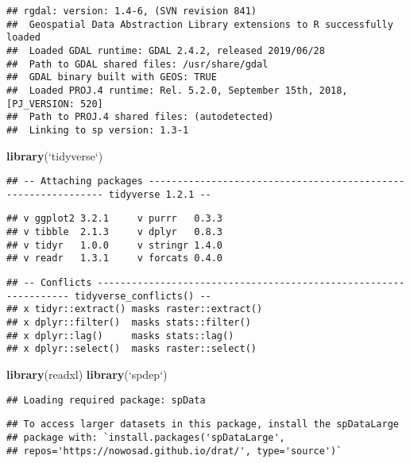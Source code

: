 \documentclass[11pt,]{article}
\newenvironment{Shaded}{\begin{snugshade}}{\end{snugshade}}
\newcommand{\KeywordTok}[1]{\textcolor[rgb]{0.13,0.29,0.53}{\textbf{#1}}}
\newcommand{\DataTypeTok}[1]{\textcolor[rgb]{0.13,0.29,0.53}{#1}}
\newcommand{\StringTok}[1]{\textcolor[rgb]{0.31,0.60,0.02}{#1}}
\newcommand{\NormalTok}[1]{#1}
\begin{document}
\begin{verbatim}
## rgdal: version: 1.4-6, (SVN revision 841)
##  Geospatial Data Abstraction Library extensions to R successfully loaded
##  Loaded GDAL runtime: GDAL 2.4.2, released 2019/06/28
##  Path to GDAL shared files: /usr/share/gdal
##  GDAL binary built with GEOS: TRUE 
##  Loaded PROJ.4 runtime: Rel. 5.2.0, September 15th, 2018, [PJ_VERSION: 520]
##  Path to PROJ.4 shared files: (autodetected)
##  Linking to sp version: 1.3-1
\end{verbatim}

\begin{Shaded}
\begin{Highlighting}[]
\KeywordTok{library}\NormalTok{(}\StringTok{`}\DataTypeTok{tidyverse}\StringTok{`}\NormalTok{)}
\end{Highlighting}
\end{Shaded}

\begin{verbatim}
## -- Attaching packages -------------------------------------------------------------- tidyverse 1.2.1 --
\end{verbatim}

\begin{verbatim}
## v ggplot2 3.2.1     v purrr   0.3.3
## v tibble  2.1.3     v dplyr   0.8.3
## v tidyr   1.0.0     v stringr 1.4.0
## v readr   1.3.1     v forcats 0.4.0
\end{verbatim}

\begin{verbatim}
## -- Conflicts ----------------------------------------------------------------- tidyverse_conflicts() --
## x tidyr::extract() masks raster::extract()
## x dplyr::filter()  masks stats::filter()
## x dplyr::lag()     masks stats::lag()
## x dplyr::select()  masks raster::select()
\end{verbatim}

\begin{Shaded}
\begin{Highlighting}[]
\KeywordTok{library}\NormalTok{(readxl)}
\KeywordTok{library}\NormalTok{(}\StringTok{`}\DataTypeTok{spdep}\StringTok{`}\NormalTok{)}
\end{Highlighting}
\end{Shaded}

\begin{verbatim}
## Loading required package: spData
\end{verbatim}

\begin{verbatim}
## To access larger datasets in this package, install the spDataLarge
## package with: `install.packages('spDataLarge',
## repos='https://nowosad.github.io/drat/', type='source')`
\end{verbatim}
\end{document}
